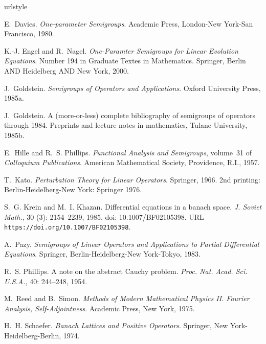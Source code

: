 
\begin{thebibliography}{11}
\providecommand{\natexlab}[1]{#1}
\providecommand{\url}[1]{\texttt{#1}}
\expandafter\ifx\csname urlstyle\endcsname\relax
  \providecommand{\doi}[1]{doi: #1}\else
  \providecommand{\doi}{doi: \begingroup \urlstyle{rm}\Url}\fi

E.~Davies.
\newblock \emph{One-parameter Semigroups}.
\newblock Academic Press, London-New York-San Francisco, 1980.

K.-J. Engel and R.~Nagel.
\newblock \emph{One-Paramter Semigroups for Linear Evolution Equations}.
\newblock Number 194 in Graduate Textes in Mathematics. Springer, Berlin AND
  Heidelberg AND New York, 2000.

\bibitem[Goldstein(1985{\natexlab{a}})]{goldstein:1985a}
J.~Goldstein.
\newblock \emph{Semigroups of Operators and Applications}.
\newblock Oxford University Press, 1985{\natexlab{a}}.

\bibitem[Goldstein(1985{\natexlab{b}})]{goldstein:1985b}
J.~Goldstein.
\newblock A (more-or-less) complete bibliography of semigroups of operators
  through 1984.
\newblock Preprints and lecture notes in mathematics, Tulane University,
  1985{\natexlab{b}}.

E.~Hille and R.~S. Phillips.
\newblock \emph{Functional Analysis and Semigroups}, volume~31 of
  \emph{Colloquium Publications}.
\newblock American Mathematical Society, Providence, R.I., 1957.

T.~Kato.
\newblock \emph{Perturbation Theory for Linear Operators}.
\newblock Springer, 1966.
\newblock 2nd printing: Berlin-Heidelberg-New York: Springer 1976.

S.~G. Krein and M.~I. Khazan.
\newblock Differential equations in a banach space.
\newblock \emph{J. Soviet Math.}, 30 (3): 2154--2239, 1985.
\newblock \doi{10.1007/BF02105398}.
\newblock URL \url{https://doi.org/10.1007/BF02105398}.

A.~Pazy.
\newblock \emph{Semigroups of Linear Operators and Applications to Partial
  Differential Equations}.
\newblock Springer, Berlin-Heidelberg-New York-Tokyo, 1983.

R.~S. Phillips.
\newblock A note on the abstract {Cauchy} problem.
\newblock \emph{Proc. Nat. Acad. Sci. U.S.A.}, 40: 244--248, 1954.

M.~Reed and B.~Simon.
\newblock \emph{Methods of Modern Mathematical Physics {II}. {Fourier}
  Analysis, Self-Adjointness}.
\newblock Academic Press, New York, 1975.

H.~H. Schaefer.
\newblock \emph{Banach Lattices and Positive Operators}.
\newblock Springer, New York-Heidelberg-Berlin, 1974.

\end{thebibliography}
